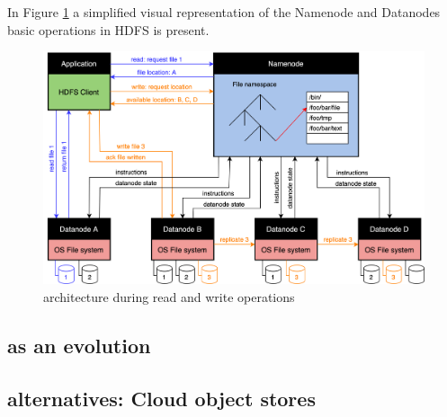 In Figure \ref{fig:hdfs} a simplified visual representation of the Namenode and Datanodes basic operations in \gls{HDFS} is present.

\begin{figure}[!ht]
    \begin{center}
      \includegraphics[width=\textwidth]{figures/2-background/HDFS.png}
    \end{center}
    \caption{ architecture during read and write operations}
    \label{fig:hdfs}
\end{figure}
 
\subsection{ as an  evolution}


\subsection{ alternatives: Cloud object stores}
